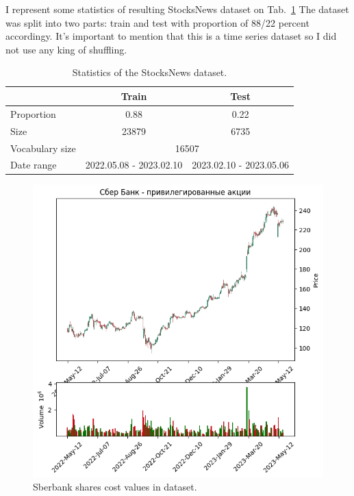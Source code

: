 \documentclass{article}
\begin{document}
I represent some statistics of resulting StocksNews dataset on Tab.~\ref{tab:statistics} The dataset was split into two parts: train and test with proportion of 88/22 percent accordingy. It's important to mention that this is a time series dataset so I did not use any king of shuffling. 

\begin{table}[tbh!]
\begin{center}
\begin{tabular}[t]{|l|cc|}
\hline
 & Train & Test \\
\hline
Proportion & 0.88 & 0.22  \\
Size & 23879 & 6735 \\
Vocabulary size & \multicolumn{2}{c|}{16507} \\
Date range & 2022.05.08 - 2023.02.10 & 2023.02.10 - 2023.05.06 \\

\hline
\end{tabular}
\caption{Statistics of the StocksNews dataset.}
\label{tab:statistics}
\end{center}
\end{table}

\begin{figure}[!tbh]
    \centering
    \includegraphics[width=0.9\linewidth]{sber.png}
    \caption{Sberbank shares cost values in dataset.}
    \label{fig:sber}
\end{figure}
\end{document}
